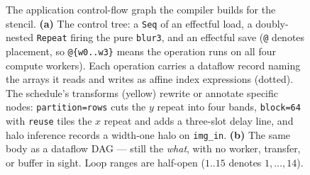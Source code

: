 \begin{figure}[tbp]
  \caption[The stencil's ACFG and dataflow DAG]{The application control-flow
    graph the compiler builds for the stencil. \textbf{(a)} The control tree: a
    \texttt{Seq} of an effectful load, a doubly-nested \texttt{Repeat} firing the
    pure \texttt{blur3}, and an effectful save (\texttt{@} denotes placement, so
    \texttt{@\{w0..w3\}} means the operation runs on all four compute workers).
    Each operation carries a dataflow record naming the arrays it reads and
    writes as affine index expressions (dotted). The schedule's transforms (yellow) rewrite or annotate specific
    nodes: \texttt{partition=rows} cuts the $y$ repeat into four bands,
    \texttt{block=64} with \texttt{reuse} tiles the $x$ repeat and adds a
    three-slot delay line, and halo inference records a width-one halo on
    \texttt{img\_in}. \textbf{(b)} The same body as a dataflow DAG --- still the
    \emph{what}, with no worker, transfer, or buffer in sight. Loop ranges are
    half-open ($1..15$ denotes $1,\dots,14$).}
  \label{fig:wt-acfg}
\end{figure}
